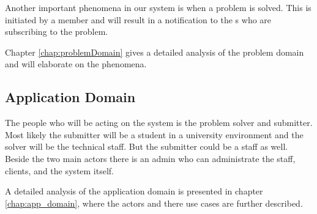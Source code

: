 Another important phenomena in our system is when a problem is solved.
This is initiated by a \astaff member and will result in a notification to the \aclient s who are subscribing to the problem.

Chapter \ref{chap:problemDomain} gives a detailed analysis of the problem domain and will elaborate on the phenomena.

\subsection{Application Domain}
The people who will be acting on the system is the problem solver and submitter. Most likely the submitter will be a student in a university environment and the solver will be the technical staff. But the submitter could be a staff as well. Beside the two main actors there is an admin who can administrate the staff, clients, and the system itself.

A detailed analysis of the application domain is presented in chapter \ref{chap:app_domain}, where the actors and there use cases are further described.